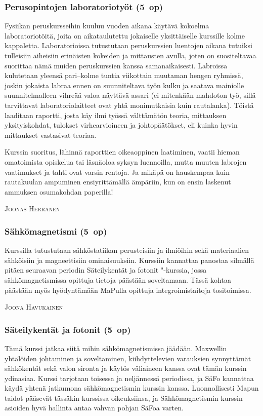\documentclass[../ala_hataile.tex]{subfiles}
\begin{document}
	\subsubsection*{Perusopintojen laboratoriotyöt (5~op)}
	Fysiikan perus\-kursseihin kuuluu vuoden
	aikana käytävä kokoelma laboratorio\-töitä,
	joita on aika\-taulutettu jokaiselle yksittäiselle
	kurssille kolme kappaletta. Laboratorioissa
	tutustutaan perus\-kurssien luentojen
	aikana tutuiksi tulleisiin aiheisiin erinäisten
	kokeiden ja mittausten avulla, joten on suositeltavaa suorittaa nämä muiden peruskurssien
	kanssa samanaikaisesti.
	Labroissa kulutetaan yleensä pari--kolme
	tuntia viikottain muutaman hengen
	ryhmissä, joskin jokaista labraa ennen on
	suunniteltava työn kulku ja saatava mainiolle
	suunnitelmalleen vihreää valoa
	näyttävä assari (ei mitenkään mahdoton
	työ, sillä tarvittavat laboratorio\-laitteet ovat
 yhtä monimutkaisia kuin rauta\-lanka).
	Töistä laaditaan raportti, josta käy
	ilmi työssä välttämätön teoria, mittauksen
	yksityiskohdat, tulokset virhe\-arvioineen ja
	johto\-päätökset, eli kuinka hyvin mittaukset
	vastasivat teoriaa.
	
	Kurssin suoritus, lähinnä raporttien
	oikeaoppinen laatiminen, vaatii hieman
	oma\-toimista opiskelua tai läsnä\-oloa syksyn
	luennoilla, mutta muuten labrojen vaatimukset
	ja tahti ovat varsin rentoja. Ja mikäpä
	on hauskempaa kuin rauta\-kuulan ampuminen
	ensi\-yrittämällä ämpäriin, kun on
	ensin laskenut ammuksen osumakohdan paperilla!
	
	\vspace{0.5cm}
	\noindent\textsc{Joonas Herranen}
	
	\subsubsection*{Sähkömagnetismi (5~op)}
	Kurssilla tutustutaan sähkö\-statiikan perusteisiin
	ja ilmiöihin sekä materiaalien
	sähköisiin ja magneettisiin ominaisuuksiin. Kurssiin kannattaa panostaa
	silmällä pitäen seuraavan periodin
	Säteily\-kentät ja fotonit "-kurssia, jossa sähkö\-magnetismissa
	opittuja tietoja päästään
	soveltamaan. Tässä kohtaa päästään myös hyödyntämään MaPulla opittuja integroimis\-taitoja
	tositoimissa.
	
	\vspace{0.5cm}
	\noindent\textsc{Joona Havukainen}
	
	\subsubsection*{Säteilykentät ja fotonit (5~op)}
	Tämä kurssi jatkaa siitä mihin sähkö\-magnetismissa
	jäädään. Maxwellin yhtälöiden
	johtaminen ja soveltaminen, kiihdyttelevien
	varauksien synnyttämät sähkökentät
	sekä valon sironta ja käytös väliaineen
	kanssa ovat tämän kurssin ydinasiaa. Kurssi
	tarjotaan toisessa ja neljännessä periodissa,
	ja SäFo kannattaa käydä yhtenä jatkumona
	sähkömagnetismin kurssin kanssa. Luonnollisesti
	Mapun taidot pääsevät tässäkin
	kurssissa oikeuksiinsa, ja Sähkö\-magnetismin
	kurssin asioiden hyvä hallinta antaa
	vahvan pohjan SäFoa varten.
	
\end{document}
